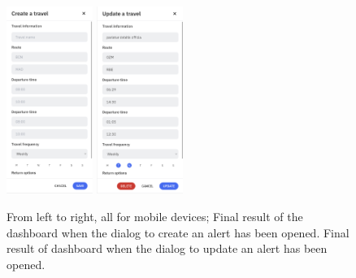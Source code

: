 \documentclass[./memory.tex]{subfiles}
\begin{document}
\begin{figure}[H]
	\centering
	\includegraphics[width=0.25\textwidth]{./assets/results/mobile-create.png}
	\hspace*{12pt}
	\includegraphics[width=0.25\textwidth]{./assets/results/mobile-update.png}
	\caption{From left to right, all for mobile devices; Final result of the
		dashboard when the dialog to create an alert has been opened. Final result
		of dashboard when the dialog to update an alert has been opened.}
\end{figure}
\end{document}
